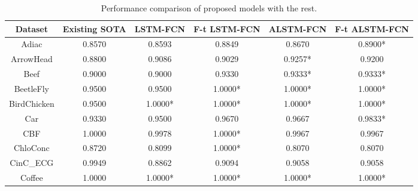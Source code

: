 \documentclass[article]{IEEEtran}
\begin{document}
 \begin{table}[]
 \centering
 \caption{Performance comparison of proposed models with the rest. }
\label{tab:perf_tab}
\begin{adjustbox}{width=1 \linewidth}

 \begin{tabularx}{0.62 \textwidth}{|C|C|C|C|C|C|}

    \hline
    Dataset & Existing SOTA \cite{Schafer_2017, wang2017time} & LSTM-FCN  & F-t LSTM-FCN & ALSTM-FCN & F-t ALSTM-FCN \\
    \hline
    Adiac & 0.8570 & 0.8593 & 0.8849 & 0.8670 & 0.8900*\\
    \hline
    ArrowHead & 0.8800 & 0.9086 & 0.9029 & 0.9257* & 0.9200 \\
    \hline
    Beef  & 0.9000 & 0.9000 & 0.9330 & 0.9333* & 0.9333* \\
    \hline
    BeetleFly & 0.9500 & 0.9500 & 1.0000* & 1.0000* & 1.0000* \\
    \hline
    BirdChicken & 0.9500 & 1.0000* & 1.0000* & 1.0000* & 1.0000* \\
    \hline
    Car   & 0.9330 & 0.9500 & 0.9670 & 0.9667 & 0.9833* \\
    \hline
    CBF   & 1.0000 & 0.9978 & 1.0000* & 0.9967 & 0.9967 \\
    \hline
    ChloConc & 0.8720 & 0.8099 & 1.0000* & 0.8070 & 0.8070 \\
    \hline
    CinC\_ECG & 0.9949 & 0.8862 & 0.9094 & 0.9058 & 0.9058 \\
    \hline
    Coffee & 1.0000 & 1.0000* & 1.0000* & 1.0000* & 1.0000* \\

\end{tabularx}
\end{adjustbox}
\end{table}
\end{document}
